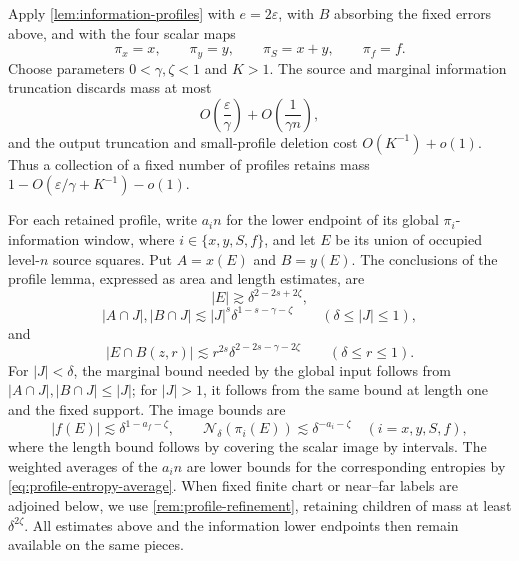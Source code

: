 \documentclass[11pt]{article}
\begin{document}
Apply \cref{lem:information-profiles} with \(e=2\varepsilon\), with \(B\)
absorbing the fixed errors above, and with the four scalar maps
\[
 \pi_x=x,\qquad \pi_y=y,\qquad \pi_S=x+y,\qquad \pi_f=f.
\]
Choose parameters \(0<\gamma,\zeta<1\) and \(K>1\).
The source and marginal information truncation discards mass at most
\begin{equation}
 O\!\left(\frac{\varepsilon}{\gamma}\right)
 +O\!\left(\frac{1}{\gamma n}\right),
 \label{eq:RZ-profile-tail-loss}
\end{equation}
and the output truncation and small-profile deletion cost
\(O(K^{-1})+o(1)\).  Thus a collection of a fixed number of profiles
retains mass \(1-O(\varepsilon/\gamma+K^{-1})-o(1)\).

For each retained profile, write \(a_i n\) for the lower endpoint
of its global \(\pi_i\)-information window, where
\(i\in\{x,y,S,f\}\), and let \(E\) be its union of occupied
level-\(n\) source squares.  Put \(A=x(E)\) and \(B=y(E)\).
The conclusions of the profile lemma, expressed as area and length
estimates, are
\begin{equation}
 |E|\gtrsim\delta^{2-2s+2\zeta},
 \label{eq:RZ-profile-size}
\end{equation}
\begin{equation}
 |A\cap J|,|B\cap J|
 \lesssim |J|^s\delta^{1-s-\gamma-\zeta}
 \qquad(\delta\le |J|\le1),
 \label{eq:RZ-profile-marginal-nc}
\end{equation}
and
\begin{equation}
 |E\cap B(z,r)|
 \lesssim r^{2s}\delta^{2-2s-\gamma-2\zeta}
 \qquad(\delta\le r\le1).
 \label{eq:RZ-profile-source-nc}
\end{equation}
For \(|J|<\delta\), the marginal bound needed by the global input
follows from \(|A\cap J|,|B\cap J|\le |J|\); for \(|J|>1\),
it follows from the same bound at length one and the fixed support.
The image bounds are
\begin{equation}
 |f(E)|\lesssim\delta^{1-a_f-\zeta},\qquad
 \mathcal N_\delta(\pi_i(E))\lesssim\delta^{-a_i-\zeta}
 \quad(i=x,y,S,f),
 \label{eq:RZ-profile-image-upper}
\end{equation}
where the length bound follows by covering the scalar image by
intervals.  The weighted averages of the \(a_i n\) are lower bounds
for the corresponding entropies by
\eqref{eq:profile-entropy-average}.  When fixed finite chart or
near--far labels are adjoined below, we use
\cref{rem:profile-refinement}, retaining children of mass at least
\(\delta^{2\zeta}\).  All estimates above and the information
lower endpoints then remain available on the same pieces.
\end{document}
